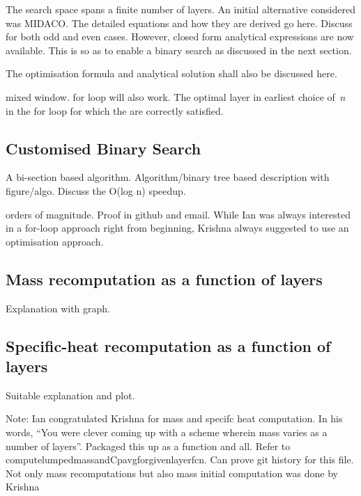 The  search space  spans  a finite  number of  layers.  An initial  alternative
considered  was MIDACO.  The detailed  equations and  how they  are derived  go
here. Discuss  for both  odd and  even cases.  However, closed  form analytical
expressions are  now available.  This is  so as  to enable  a binary  search as
discussed in the next section.

The optimisation formula and analytical solution shall also be discussed here.

mixed  %
window.  for loop  will also  work.  The optimal  layer  in %
earliest choice  of~$n$ in the  for loop for which  the %
are correctly satisfied.

\subsection{Customised Binary Search}

A bi-section based algorithm. Algorithm/binary tree based description with
figure/algo. Discuss the O(log n) speedup.

orders of magnitude. Proof in github  and email. While Ian was always interested
in a for-loop approach right from  beginning, Krishna always suggested to use an
optimisation approach.

\subsection{Mass recomputation as a function of layers}
Explanation with graph.

\subsection{Specific-heat recomputation as a function of layers}
Suitable explanation and plot.

Note: Ian congratulated Krishna for mass and specifc heat computation. In his
words, ``You were clever coming up with a scheme wherein mass varies as a
number of layers''. Packaged this up as a function and all. Refer to
computelumpedmassandCpavgforgivenlayerfcn. Can prove git history for this file.
Not only mass recomputations but also mass initial computation was done by
Krishna

